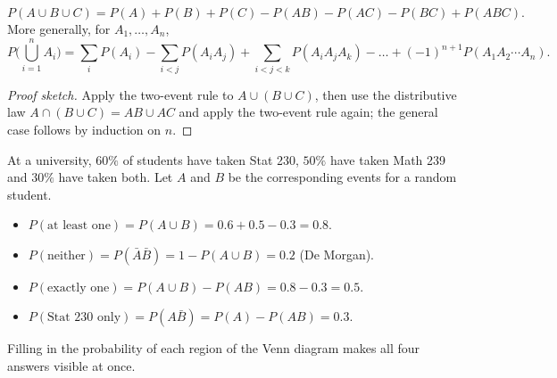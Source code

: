 \begin{theorem}
\[
  P(A\cup B\cup C) = P(A)+P(B)+P(C) - P(AB) - P(AC) - P(BC) + P(ABC).
\]
More generally, for $A_1,\dots,A_n$,
\[
  P\Big(\bigcup_{i=1}^n A_i\Big) = \sum_i P(A_i) - \sum_{i<j} P(A_iA_j)
  + \sum_{i<j<k} P(A_iA_jA_k) - \dots + (-1)^{n+1} P(A_1A_2\cdots A_n).
\]
\end{theorem}

\begin{proof}[Proof sketch]
Apply the two-event rule to $A \cup (B \cup C)$, then use the distributive law
$A\cap(B\cup C) = AB \cup AC$ and apply the two-event rule again; the general case follows
by induction on $n$.
\end{proof}

\begin{example}
At a university, $60\%$ of students have taken Stat 230, $50\%$ have taken Math 239 and
$30\%$ have taken both. Let $A$ and $B$ be the corresponding events for a random student.
\begin{itemize}
  \item $P(\text{at least one}) = P(A\cup B) = 0.6 + 0.5 - 0.3 = 0.8$.
  \item $P(\text{neither}) = P(\bar A \bar B) = 1 - P(A\cup B) = 0.2$ (De Morgan).
  \item $P(\text{exactly one}) = P(A\cup B) - P(AB) = 0.8 - 0.3 = 0.5$.
  \item $P(\text{Stat 230 only}) = P(A\bar B) = P(A) - P(AB) = 0.3$.
\end{itemize}
\end{example}

Filling in the probability of each region of the Venn diagram makes all four answers
visible at once.

\begin{center}
\end{center}

